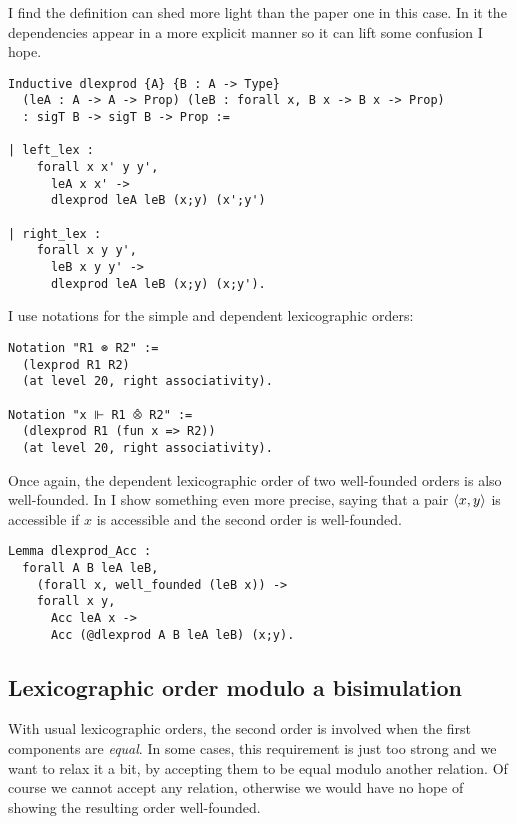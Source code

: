 I find the \Coq definition can shed more light than the paper one in this case.
In it the dependencies appear in a more explicit manner so it can lift some
confusion I hope.

\begin{verbatim}
Inductive dlexprod {A} {B : A -> Type}
  (leA : A -> A -> Prop) (leB : forall x, B x -> B x -> Prop)
  : sigT B -> sigT B -> Prop :=

| left_lex :
    forall x x' y y',
      leA x x' ->
      dlexprod leA leB (x;y) (x';y')

| right_lex :
    forall x y y',
      leB x y y' ->
      dlexprod leA leB (x;y) (x;y').
\end{verbatim}

I use notations for the simple and dependent lexicographic orders:
\begin{verbatim}
Notation "R1 ⊗ R2" :=
  (lexprod R1 R2)
  (at level 20, right associativity).

Notation "x ⊩ R1 ⨶ R2" :=
  (dlexprod R1 (fun x => R2))
  (at level 20, right associativity).
\end{verbatim}

Once again, the dependent lexicographic order of two well-founded orders is also
well-founded. In \Coq I show something even more precise, saying that a pair
\(\langle x,y \rangle\) is accessible if \(x\) is accessible and the second order is
well-founded.
\begin{verbatim}
Lemma dlexprod_Acc :
  forall A B leA leB,
    (forall x, well_founded (leB x)) ->
    forall x y,
      Acc leA x ->
      Acc (@dlexprod A B leA leB) (x;y).
\end{verbatim}

\subsection{Lexicographic order modulo a bisimulation}

With usual lexicographic orders, the second order is involved when the first
components are \emph{equal}. In some cases, this requirement is just too strong
and we want to relax it a bit, by accepting them to be equal modulo another
relation. Of course we cannot accept any relation, otherwise we would have no
hope of showing the resulting order well-founded.

